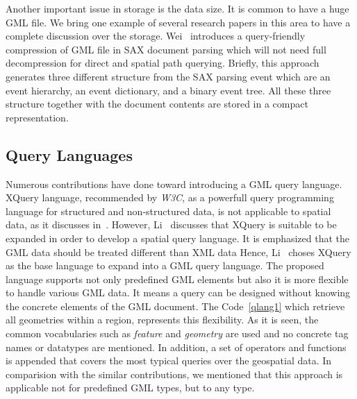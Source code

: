 \documentclass[a4paper,12pt]{article}
\begin{document}
Another important issue in storage is the data size. It is common to have a 
huge GML file. We bring one example of several research papers in this area 
to have a complete discussion over the storage.
Wei~\cite{Wei2011} introduces a query-friendly compression of GML file in SAX document 
parsing which will not need full decompression for direct and spatial path querying. 
Briefly, this approach generates three different structure from the SAX parsing event
which are an event hierarchy, an event dictionary, and a binary event tree.
All these three structure together with the document contents are stored in a compact
representation.

\subsection{Query Languages}
\label{queryLang}
Numerous contributions have done toward introducing a GML query language.
XQuery language, recommended by \emph{W3C}, as a powerfull query programming language for structured and non-structured data, 
is not applicable to spatial data, as it discusses in~\cite{Lisa2006,Chen2010}.
However, Li~\cite{Lisa2006} discusses that XQuery is suitable to be expanded in order to develop a spatial query language.
It is emphasized that the GML data should be treated different than XML data 
Hence, Li~\cite{Lisa2006} choses XQuery as the base language to expand into a GML query language. 
The proposed language supports not only predefined GML elements
but also it is more flexible to handle various GML data. 
It means a query can be designed without knowing the concrete elements of the GML document.
The Code~\ref{qlang1} which retrieve all geometries within a region,
represents this flexibility. As it is seen, 
the common vocabularies such as \textit{feature} and \textit{geometry} are used and no concrete tag names or datatypes are mentioned.
In addition, a set of operators and functions is appended that covers the most typical queries over the geospatial data. 
In comparision with the similar contributions, we mentioned that 
this approach is applicable not for predefined GML types, but to any type.

\vspace{10px}
\vspace{10px}
\end{document}

